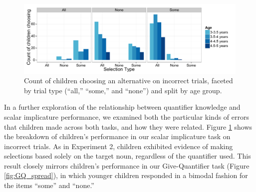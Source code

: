 \documentclass[man]{apa2}
\begin{document}
\begin{figure} 
 \begin{center} 
  \includegraphics[scale=.5]{figures/exp3_wrong.pdf} 
  \caption{\label{fig:exp3_wrong} Count of children choosing an alternative on incorrect trials, faceted by trial type (``all,'' ``some,'' and ``none'') and split by age group.} 
 \end{center} 
\end{figure}

In a further exploration of the relationship between quantifier knowledge and scalar implicature performance, we examined both the particular kinds of errors that children made across both tasks, and how they were related. Figure \ref{fig:exp3_wrong} shows the breakdown of children's performance in our scalar implicature task on incorrect trials. As in Experiment 2, children exhibited evidence of making selections based solely on the target noun, regardless of the quantifier used. This result closely mirrors children's performance in our Give-Quantifier task (Figure \ref{fig:GQ_spread}), in which younger children responded in a bimodal fashion for the items ``some'' and ``none.'' 
\end{document}
